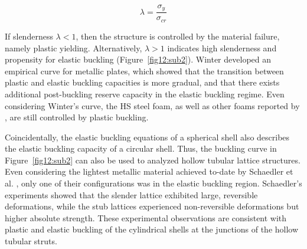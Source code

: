 \documentclass[review]{elsarticle}
\begin{document}
\begin{equation}\label{Eq5}
\lambda=\frac{\sigma_y}{\sigma_{cr}}
\end{equation}

If slenderness $\lambda<1$, then the structure is controlled by the material failure, namely plastic yielding. Alternatively, $\lambda>1$ indicates high slenderness and propensity for elastic buckling (Figure~\ref{fig12:sub2}). Winter \cite{Winter1947} developed an empirical curve for metallic plates, which showed that the transition between plastic and elastic buckling capacities is more gradual, and that there exists additional post-buckling reserve capacity in the elastic buckling regime. Even considering Winter's curve, the HS steel foam, as well as other foams reported by \cite{Fallet2008}, are still controlled by plastic buckling.

Coincidentally, the elastic buckling equations of a spherical shell also describes the elastic buckling capacity of a circular shell. Thus, the buckling curve in Figure~\ref{fig12:sub2} can also be used to analyzed hollow tubular lattice structures. Even considering the lightest metallic material achieved to-date by Schaedler et al. \cite{Sch2011}, only one of their configurations was in the elastic buckling region. Schaedler's experiments showed that the slender lattice exhibited large, reversible deformations, while the stub lattices experienced non-reversible deformations but higher absolute strength. These experimental observations are consistent with plastic and elastic buckling of the cylindrical shells at the junctions of the hollow tubular struts.
\end{document}
